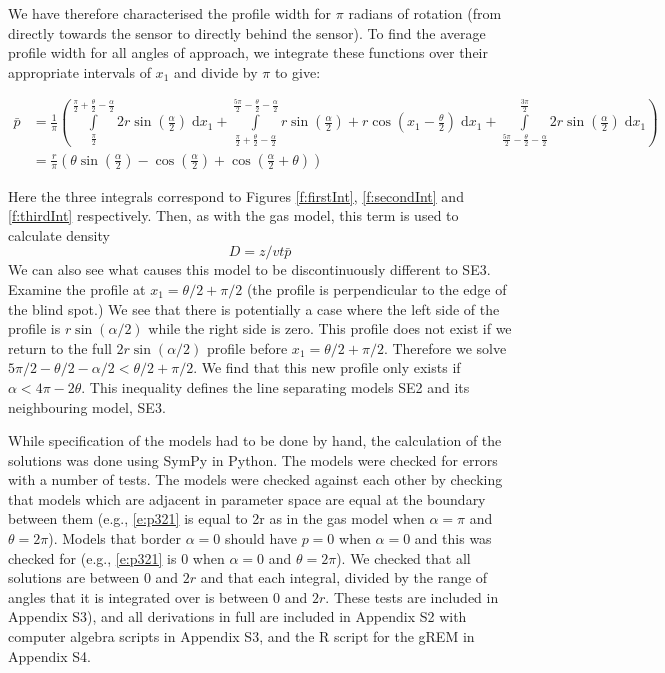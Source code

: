 \documentclass[a4paper,10pt,reqno,oneside]{amsart}
\begin{document}
We have therefore characterised the profile width for $\pi$ radians of rotation (from directly towards the sensor to directly behind the sensor). To find the average profile width for all angles of approach, we integrate these functions over their appropriate intervals of $x_1$ and divide by $\pi$ to give:

\begin{align}
    \bar{p} &=\frac{1}{\pi} \left(\int\limits_{\frac{\pi}{2}}^{\frac{\pi}{2} + \frac{\theta}{2} - \frac{\alpha}{2}}2 r \sin{\left (\frac{\alpha}{2} \right )}\;\mathrm{d}x_1+\int\limits_{\frac{\pi}{2} + \frac{\theta}{2} - \frac{\alpha}{2}}^{\frac{5 \pi}{2} - \frac{\theta}{2} - \frac{\alpha}{2}}r \sin{\left (\frac{\alpha}{2} \right )} + r \cos{\left (x_1 - \frac{\theta}{2} \right )}\;\mathrm{d}x_1+\int\limits_{\frac{5 \pi}{2} - \frac{\theta}{2} - \frac{\alpha}{2}}^{\frac{3 \pi}{2}}2 r \sin{\left (\frac{\alpha}{2} \right )}\;\mathrm{d}x_1\right) \nonumber  \\
     &= \frac{r}{\pi} \left(\theta \sin{\left (\frac{\alpha}{2} \right )} - \cos{\left (\frac{\alpha}{2} \right )} + \cos{\left (\frac{\alpha}{2} + \theta \right )}\right) \label{e:p321}
\end{align}

Here the three integrals correspond to Figures \ref{f:firstInt}, \ref{f:secondInt} and \ref{f:thirdInt} respectively. Then, as with the gas model, this term is used to calculate density
\begin{equation}
\label{e:gas}
D = z/vt\bar{p}
\end{equation}
We can also see what causes this model to be discontinuously different to SE3. Examine the profile at $x_1 = 	\theta/2 + \pi/2$ (the profile is perpendicular to the edge of the blind spot.) We see that there is potentially a case where the left side of the profile is $r\sin( \alpha/2)$ while the right side is zero. This profile does not exist if we return to the full $2r\sin( \alpha/2)$ profile before $x_1  = \theta/2 + \pi/2$. Therefore we solve $5\pi/2 - \theta/2 - \alpha/2 <  \theta/2 + \pi/2$. We find that this new profile only exists if $ \alpha < 4\pi - 2 \theta$. This inequality defines the line separating models SE2 and its neighbouring model, SE3.

While specification of the models had to be done by hand, the calculation of the solutions was done using SymPy \citep{sympy} in Python. The models were checked for errors with a number of tests. The models were checked against each other by checking that models which are adjacent in parameter space are equal at the boundary between them (e.g., \ref{e:p321} is equal to 2r as in the gas model when $\alpha=\pi$ and $\theta=2\pi$). Models that border $ \alpha = 0$ should have $p = 0$ when $ \alpha = 0$ and this was checked for (e.g., \ref{e:p321} is 0 when $\alpha=0$ and $\theta=2\pi$). We checked that all solutions are between 0 and $2r$ and that each integral, divided by the range of angles that it is integrated over is between 0 and $2r$. These tests are included in Appendix S3), and all derivations in full are included in Appendix S2 with computer algebra scripts in Appendix S3, and the R \citep{R} script for the gREM in Appendix S4.  
\end{document}
